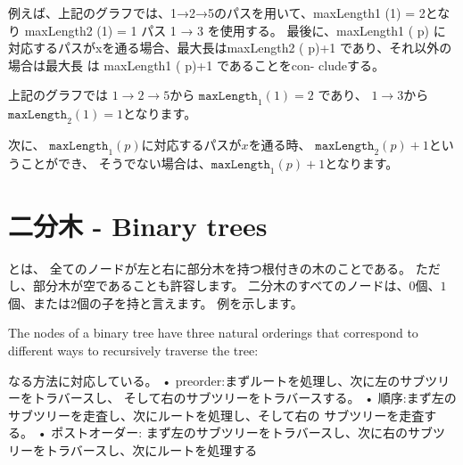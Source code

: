例えば、上記のグラフでは、1→2→5のパスを用いて、maxLength1 (1) = 2となり maxLength2 (1) = 1 パス 1 → 3 を使用する。
最後に、maxLength1 ( p) に対応するパスがxを通る場合、最大長はmaxLength2 ( p)+1 であり、それ以外の場合は最大長 は maxLength1 ( p)+1 であることをcon- cludeする。

上記のグラフでは
$1 \rightarrow 2 \rightarrow 5$から
$\texttt{maxLength}_1(1)=2$
であり、
$1 \rightarrow 3$から
$\texttt{maxLength}_2(1)=1$となります。

次に、
$\texttt{maxLength}_1(p)$に対応するパスが$x$を通る時、
$\texttt{maxLength}_2(p)+1$ということができ、
そうでない場合は、$\texttt{maxLength}_1(p)+1$となります。


\section{二分木 - Binary trees}


\begin{samepage}

とは、
全てのノードが左と右に部分木を持つ根付きの木のことである。
ただし、部分木が空であることも許容します。
二分木のすべてのノードは、$0$個、$1$個、または$2$個の子を持と言えます。
例を示します。

\begin{center}
\end{center}
\end{samepage}


The nodes of a binary tree have three natural
orderings that correspond to different ways to
recursively traverse the tree:


なる方法に対応している。
• preorder:まずルートを処理し、次に左のサブツリーをトラバースし、 そして右のサブツリーをトラバースする。
• 順序:まず左のサブツリーを走査し、次にルートを処理し、そして右の サブツリーを走査する。
• ポストオーダー: まず左のサブツリーをトラバースし、次に右のサブツ リーをトラバースし、次にルートを処理する

